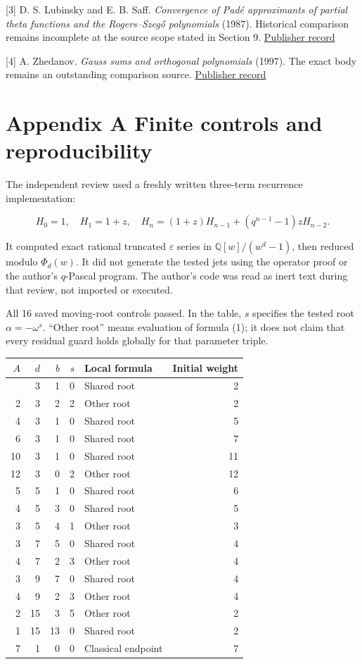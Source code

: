 \documentclass[
  11pt,
]{article}
\begin{document}
{[}3{]} D. S. Lubinsky and E. B. Saff. \emph{Convergence of Padé
approximants of partial theta functions and the Rogers--Szegő
polynomials} (1987). Historical comparison remains incomplete at the
source scope stated in Section 9.
\href{https://doi.org/10.1007/BF01890574}{Publisher record}

{[}4{]} A. Zhedanov. \emph{Gauss sums and orthogonal polynomials}
(1997). The exact body remains an outstanding comparison source.
\href{https://doi.org/10.1142/S0217751X97000438}{Publisher record}

\section{Appendix A Finite controls and
reproducibility}\label{appendix-a-finite-controls-and-reproducibility}

The independent review used a freshly written three-term recurrence
implementation:

\[
H_0=1,\quad H_1=1+z,\quad
H_n=(1+z)H_{n-1}+(q^{n-1}-1)zH_{n-2}.
\]

It computed exact rational truncated \(\varepsilon\) series in
\(\mathbb Q[w]/(w^d-1)\), then reduced modulo \(\Phi_d(w)\). It did not
generate the tested jets using the operator proof or the author's
\(q\)-Pascal program. The author's code was read as inert text during
that review, not imported or executed.

All 16 saved moving-root controls passed. In the table, \(s\) specifies
the tested root \(\alpha=-\omega^s\). ``Other root'' means evaluation of
formula (1); it does not claim that every residual guard holds globally
for that parameter triple.

\begin{longtable}[]{@{}rrrrlr@{}}
\toprule\noalign{}
\(A\) & \(d\) & \(b\) & \(s\) & Local formula & Initial weight \\
\midrule\noalign{}
\endhead
\bottomrule\noalign{}
\endlastfoot
1 & 3 & 1 & 0 & Shared root & 2 \\
2 & 3 & 2 & 2 & Other root & 2 \\
4 & 3 & 1 & 0 & Shared root & 5 \\
6 & 3 & 1 & 0 & Shared root & 7 \\
10 & 3 & 1 & 0 & Shared root & 11 \\
12 & 3 & 0 & 2 & Other root & 12 \\
5 & 5 & 1 & 0 & Shared root & 6 \\
4 & 5 & 3 & 0 & Shared root & 5 \\
3 & 5 & 4 & 1 & Other root & 3 \\
3 & 7 & 5 & 0 & Shared root & 4 \\
4 & 7 & 2 & 3 & Other root & 4 \\
3 & 9 & 7 & 0 & Shared root & 4 \\
4 & 9 & 2 & 3 & Other root & 4 \\
2 & 15 & 3 & 5 & Other root & 2 \\
1 & 15 & 13 & 0 & Shared root & 2 \\
7 & 1 & 0 & 0 & Classical endpoint & 7 \\
\end{longtable}
\end{document}
